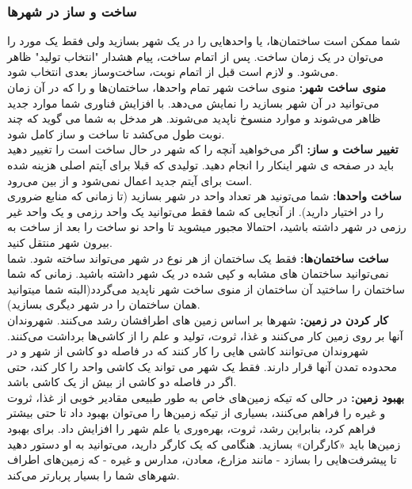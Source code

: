 \documentclass[]{article}
\begin{document}
\subsubsection*{{\titr ساخت و ساز در شهرها}}
شما ممکن است ساختمان‌ها، یا واحدهایی را در یک شهر بسازید ولی فقط یک مورد را می‌توان در یک زمان ساخت. پس از اتمام ساخت، پیام هشدار "انتخاب تولید" ظاهر می‌شود. و لازم است قبل از اتمام نوبت، ساخت‌وساز بعدی انتخاب شود.
\\\noindent \textbf{منوی ساخت شهر:}
منوی ساخت شهر تمام واحدها، ساختمان‌ها و را که در آن زمان می‌توانید در آن شهر بسازید را نمایش می‌دهد. با افزایش فناوری شما موارد جدید ظاهر می‌شوند و موارد منسوخ ناپدید می‌شوند. هر مدخل به شما می گوید که چند نوبت طول می‌کشد تا ساخت و ساز کامل شود.
\\\noindent \textbf{تغییر ساخت و ساز:}
اگر می‌خواهید آنچه را که شهر در حال ساخت است را تغییر دهید باید در صفحه ی شهر اینکار را انجام دهید. تولیدی که قبلا برای آیتم اصلی هزینه شده است برای آیتم جدید اعمال نمی‌شود و از بین می‌رود.
\\\noindent \textbf{ساخت واحدها:}
شما می‌تونید هر تعداد واحد در شهر بسازید (تا زمانی که منابع ضروری را در اختیار دارید). از آنجایی که شما فقط می‌توانید یک واحد رزمی و یک واحد غیر رزمی در شهر داشته باشید، احتمالا مجبور میشوید تا واحد نو ساخت را بعد از ساخت به بیرون شهر منتقل کنید.
\\\noindent \textbf{ساخت ساختمان‌ها:}
فقط یک ساختمان از هر نوع در شهر می‌تواند ساخته شود. شما نمی‌توانید ساختمان های مشابه و کپی شده در یک شهر داشته باشید. زمانی که شما ساختمان را ساختید آن ساختمان از منوی ساخت شهر ناپدید می‌گردد(البته شما میتوانید همان ساختمان را در شهر دیگری بسازید).
\\\noindent \textbf{کار کردن در زمین:}
شهرها بر اساس زمین های اطرافشان رشد می‌کنند. شهروندان آنها بر روی زمین کار می‌کنند و غذا، ثروت، تولید و علم را از کاشی‌ها برداشت می‌کنند. شهروندان می‌توانند کاشی هایی را کار کنند که در فاصله دو کاشی از شهر و در محدوده تمدن آنها قرار دارند. فقط یک شهر می تواند یک کاشی واحد را کار کند، حتی اگر در فاصله دو کاشی از بیش از یک کاشی باشد.
\\\noindent \textbf{بهبود زمین:}
در حالی که تیکه­ زمین­‌های خاص به طور طبیعی مقادیر خوبی از غذا، ثروت و غیره را فراهم می‌کنند، بسیاری از تیکه­ زمین‌­ها را می‌توان بهبود داد تا حتی بیشتر فراهم کرد، بنابراین رشد، ثروت، بهره‌وری یا علم شهر را افزایش داد. برای بهبود زمین‌ها باید «کارگران» بسازید. هنگامی که یک کارگر دارید، می‌توانید به او دستور دهید تا پیشرفت‌هایی را بسازد - مانند مزارع، معادن، مدارس و غیره - که زمین‌های اطراف شهرهای شما را بسیار پربارتر می‌کند.
\end{document}
